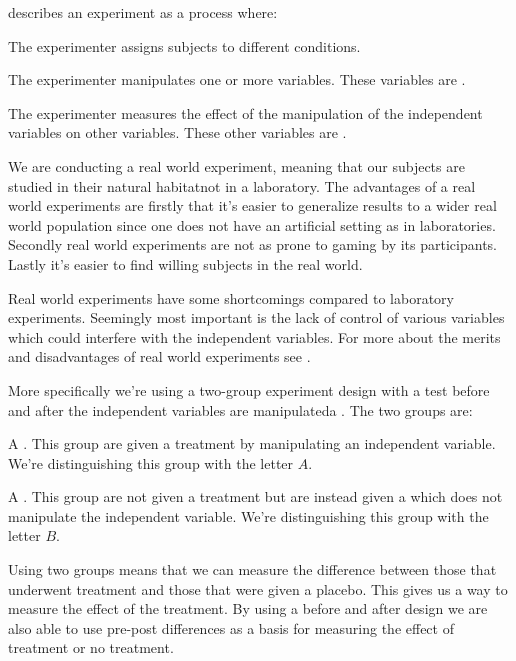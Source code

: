 \citet[]{robson93} describes an experiment as a process where:


\begin{items}
  \item The experimenter assigns subjects to different conditions.
  \item The experimenter manipulates one or more variables.
    These variables are .
  \item The experimenter measures the effect of the manipulation of
    the independent variables on other variables. These other
    variables are .
\end{items}

We are conducting a real world experiment, meaning that our subjects
are studied in their natural habitat\dash{}not in a laboratory.
The advantages of a real world experiments are firstly that it's easier to
generalize results to a wider real world population since one does not have
an artificial setting as in laboratories. Secondly real world experiments are
not as prone to gaming by its participants. Lastly it's easier to find willing
subjects in the real world.

Real world experiments have some shortcomings compared to laboratory
experiments. Seemingly most important is the lack of control of various
variables which could interfere with the independent variables.
For more about the merits and disadvantages of real world experiments
see \citet[]{robson93}.

More specifically we're using a two-group experiment design with a test before
and after the independent variables are manipulated\dash{}a .
The two groups are:

\begin{items}
  \item A . This group are given a treatment by
    manipulating an independent variable. We're distinguishing this
    group with the letter $A$.
  \item A . This group are not given a treatment but are
    instead given a  which does not manipulate the independent
    variable. We're distinguishing this group with the letter $B$.
\end{items}

Using two groups means that we can measure the difference between those that
underwent treatment and those that were given a placebo. This gives us a way
to measure the effect of the treatment.
By using a before and after design we are also able to use pre-post
differences as a basis for measuring the effect of treatment or no
treatment.

